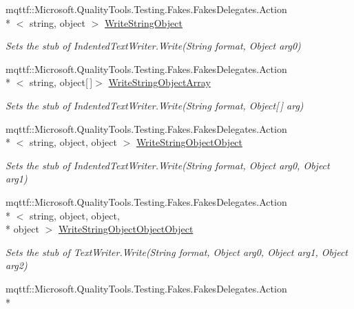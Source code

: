 \begin{DoxyCompactItemize}
mqttf\-::\-Microsoft.\-Quality\-Tools.\-Testing.\-Fakes.\-Fakes\-Delegates.\-Action\\*
$<$ string, object $>$ \hyperlink{class_system_1_1_code_dom_1_1_compiler_1_1_fakes_1_1_stub_indented_text_writer_a6f6b0db90741ae579ebc2766b20adccc}{Write\-String\-Object}
\begin{DoxyCompactList}\small\item\em Sets the stub of Indented\-Text\-Writer.\-Write(\-String format, Object arg0)\end{DoxyCompactList}\item 
mqttf\-::\-Microsoft.\-Quality\-Tools.\-Testing.\-Fakes.\-Fakes\-Delegates.\-Action\\*
$<$ string, object\mbox{[}$\,$\mbox{]}$>$ \hyperlink{class_system_1_1_code_dom_1_1_compiler_1_1_fakes_1_1_stub_indented_text_writer_a338d17c30b28ce5a431ddb2de68b2afc}{Write\-String\-Object\-Array}
\begin{DoxyCompactList}\small\item\em Sets the stub of Indented\-Text\-Writer.\-Write(\-String format, Object\mbox{[}$\,$\mbox{]} arg)\end{DoxyCompactList}\item 
mqttf\-::\-Microsoft.\-Quality\-Tools.\-Testing.\-Fakes.\-Fakes\-Delegates.\-Action\\*
$<$ string, object, object $>$ \hyperlink{class_system_1_1_code_dom_1_1_compiler_1_1_fakes_1_1_stub_indented_text_writer_acc890f5d32b9cc4d86c125187dced2a3}{Write\-String\-Object\-Object}
\begin{DoxyCompactList}\small\item\em Sets the stub of Indented\-Text\-Writer.\-Write(\-String format, Object arg0, Object arg1)\end{DoxyCompactList}\item 
mqttf\-::\-Microsoft.\-Quality\-Tools.\-Testing.\-Fakes.\-Fakes\-Delegates.\-Action\\*
$<$ string, object, object, \\*
object $>$ \hyperlink{class_system_1_1_code_dom_1_1_compiler_1_1_fakes_1_1_stub_indented_text_writer_aab3a09e837afb84d569bfd278273be85}{Write\-String\-Object\-Object\-Object}
\begin{DoxyCompactList}\small\item\em Sets the stub of Text\-Writer.\-Write(\-String format, Object arg0, Object arg1, Object arg2)\end{DoxyCompactList}\item 
mqttf\-::\-Microsoft.\-Quality\-Tools.\-Testing.\-Fakes.\-Fakes\-Delegates.\-Action\\*

\end{DoxyCompactItemize}
